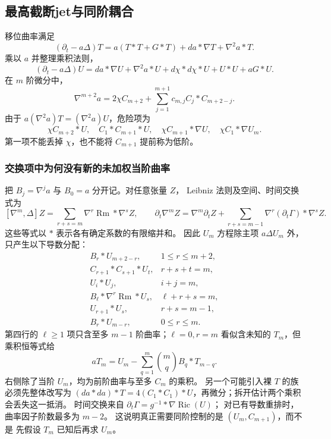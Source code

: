 \documentclass[UTF8,a4paper,11pt,fontset=fandol]{ctexart}
\numberwithin{equation}{section}
\theoremstyle{definition}
\newcommand{\Ric}{\operatorname{Ric}}
\newcommand{\Rm}{\operatorname{Rm}}
\begin{document}
\subsection{最高截断jet与同阶耦合}
移位曲率满足
\[
(\partial_t-a\Delta)T
=a(T*T+G*T)+da*\nabla T+\nabla^2a*T.
\]
乘以 $a$ 并整理乘积法则，
\[
(\partial_t-a\Delta)U
=da*\nabla U+\nabla^2a*U+d\chi*d\chi*U+U*U+aG*U.
\]
在 $m$ 阶微分中，
\[
\nabla^{m+2}a
=2\chi C_{m+2}+\sum_{j=1}^{m+1}c_{m,j}C_j*C_{m+2-j}.
\]
由于 $a(\nabla^2a)T=(\nabla^2a)U$，危险项为
\[
\chi C_{m+2}*U,\quad C_1*C_{m+1}*U,\quad
\chi C_{m+1}*\nabla U,\quad\chi C_1*\nabla U_m.
\]
第一项不能丢掉 $\chi$，也不能将 $C_{m+1}$ 提前称为低阶。

\subsubsection{交换项中为何没有新的未加权当阶曲率}\label{sec:jet-commutators}
把 $B_j=\nabla^ja$ 与 $B_0=a$ 分开记。对任意张量 $Z$，
Leibniz 法则及空间、时间交换式为
\[
[\nabla^m,\Delta]Z
=\sum_{r+s=m}\nabla^r\Rm*\nabla^sZ,\qquad
\partial_t\nabla^mZ
=\nabla^m\partial_tZ+
\sum_{r+s=m-1}\nabla^r(\partial_t\Gamma)*\nabla^sZ.
\]
这些等式以 $*$ 表示各有确定系数的有限缩并和。
因此 $U_m$ 方程除主项 $a\Delta U_m$ 外，只产生以下导数分配：
\[
\begin{array}{ll}
B_r*U_{m+2-r},&1\le r\le m+2,\\
C_{r+1}*C_{s+1}*U_t,&r+s+t=m,\\
U_i*U_j,&i+j=m,\\
B_\ell*\nabla^r\Rm*U_s,&\ell+r+s=m,\\
U_{r+1}*U_s,&r+s=m-1,\\
B_r*U_{m-r},&0\le r\le m.
\end{array}
\]
第四行的 $\ell\ge1$ 项只含至多 $m-1$ 阶曲率；$\ell=0,r=m$
看似含未知的 $T_m$，但乘积恒等式给
\begin{equation}\label{eq:current-curvature-elimination}
aT_m=U_m-\sum_{q=1}^m\binom mq B_q*T_{m-q}.
\end{equation}
右侧除了当阶 $U_m$，均为前阶曲率与至多 $C_m$ 的乘积。
另一个可能引入裸 $T$ 的族必须先整体改写为
$(da*da)*T=4(C_1*C_1)*U$，再微分；拆开估计两个乘积会丢失这一抵消。
时间交换来自 $\partial_t\Gamma=g^{-1}*\nabla\Ric(U)$；
对已有导数重排时，曲率因子阶数最多为 $m-2$。
这说明真正需要同阶控制的是 $(U_m,C_{m+1})$，而不是
先假设 $T_m$ 已知后再求 $U_m$。
\end{document}
